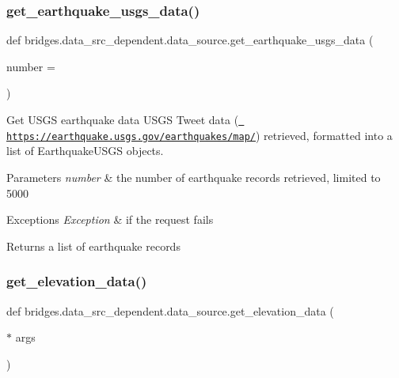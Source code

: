 \subsubsection{\texorpdfstring{get\_earthquake\_usgs\_data()}{get\_earthquake\_usgs\_data()}}
{\footnotesize\ttfamily def bridges.\+data\+\_\+src\+\_\+dependent.\+data\+\_\+source.\+get\+\_\+earthquake\+\_\+usgs\+\_\+data (\begin{DoxyParamCaption}\item[{}]{number = {} }\end{DoxyParamCaption})}



Get U\+S\+GS earthquake data U\+S\+GS Tweet data (\href{https://earthquake.usgs.gov/earthquakes/map/}{\texttt{ https\+://earthquake.\+usgs.\+gov/earthquakes/map/}}) retrieved, formatted into a list of Earthquake\+U\+S\+GS objects. 


\begin{DoxyParams}{Parameters}
{\em number} & the number of earthquake records retrieved, limited to 5000 \\
\hline
\end{DoxyParams}

\begin{DoxyExceptions}{Exceptions}
{\em Exception} & if the request fails\\
\hline
\end{DoxyExceptions}
\begin{DoxyReturn}{Returns}
a list of earthquake records 
\end{DoxyReturn}
\mbox{\label{namespacebridges_1_1data__src__dependent_1_1data__source_ac6662947ed387a2304495eb53914bba3}} 
\subsubsection{\texorpdfstring{get\_elevation\_data()}{get\_elevation\_data()}}
{\footnotesize\ttfamily def bridges.\+data\+\_\+src\+\_\+dependent.\+data\+\_\+source.\+get\+\_\+elevation\+\_\+data (\begin{DoxyParamCaption}\item[{$\ast$}]{args }\end{DoxyParamCaption})}

